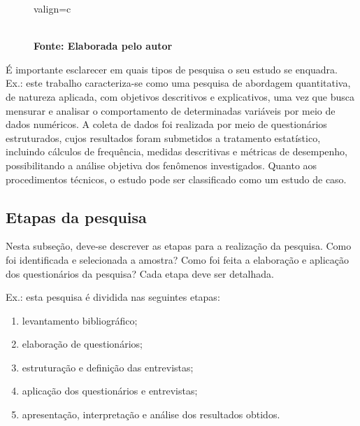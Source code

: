 \begin{figure}[H]
\begin{adjustbox}{valign=c}
{}
\end{adjustbox}
	\vspace{.1cm}  %
	\\\textbf{\footnotesize Fonte: Elaborada pelo autor}  
 \label{fig:metodologia}
\end{figure}

É importante esclarecer em quais tipos de pesquisa o seu estudo se enquadra.
Ex.: este trabalho caracteriza-se como uma pesquisa de abordagem quantitativa, de natureza aplicada, com objetivos descritivos e explicativos, uma vez que busca mensurar e analisar o comportamento de determinadas variáveis por meio de dados numéricos. A coleta de dados foi realizada por meio de questionários estruturados, cujos resultados foram submetidos a tratamento estatístico, incluindo cálculos de frequência, medidas descritivas e métricas de desempenho, possibilitando a análise objetiva dos fenômenos investigados. Quanto aos procedimentos técnicos, o estudo pode ser classificado como um estudo de caso.

\subsection{\esp Etapas da pesquisa}

	Nesta subseção, deve-se descrever as etapas para a realização da pesquisa. Como foi identificada e selecionada a amostra? Como foi feita a elaboração e aplicação dos questionários da pesquisa? Cada etapa deve ser detalhada.

Ex.: esta pesquisa é dividida nas seguintes etapas:

\begin{enumerate}
\item levantamento bibliográfico;
\item elaboração de questionários;
\item estruturação e definição das entrevistas;
\item aplicação dos questionários e entrevistas;
\item apresentação, interpretação e análise dos resultados obtidos.
\end{enumerate}

